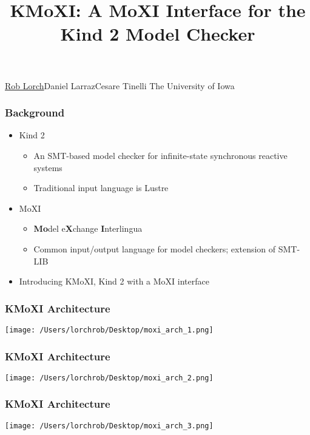 \documentclass[11pt,xcolor={dvipsnames},hyperref={pdftex,pdfpagemode=UseNone,hidelinks,pdfdisplaydoctitle=true},usepdftitle=false]{beamer}
\begin{document}

\title{KMoXI: A MoXI Interface for the Kind 2 Model Checker}

\information
%  
%
{\underline{Rob Lorch}\quad Daniel Larraz\quad Cesare Tinelli
\newline \newline   
The University of Iowa
}
%

\frame{\titlepage}

\begin{frame} 
    \frametitle{Background}
    \begin{itemize}
        \item Kind 2
        \begin{itemize}
            \item An SMT-based model checker for infinite-state synchronous reactive systems
            \item Traditional input language is Lustre
        \end{itemize}
        \pause
        \item MoXI
        \begin{itemize}
            \item \textbf{Mo}del e\textbf{X}change \textbf{I}nterlingua
            \item Common input/output language for model checkers; extension of SMT-LIB
        \end{itemize}
        \pause
        \item Introducing KMoXI, Kind 2 with a MoXI interface
    \end{itemize}
\end{frame}

\begin{frame} 
    \frametitle{KMoXI Architecture}
    \texttt{[image: /Users/lorchrob/Desktop/moxi\_arch\_1.png]}
\end{frame}

\begin{frame} 
    \frametitle{KMoXI Architecture}
    \texttt{[image: /Users/lorchrob/Desktop/moxi\_arch\_2.png]}
\end{frame}

\begin{frame} 
    \frametitle{KMoXI Architecture}
    \texttt{[image: /Users/lorchrob/Desktop/moxi\_arch\_3.png]}
\end{frame}
\end{document}
